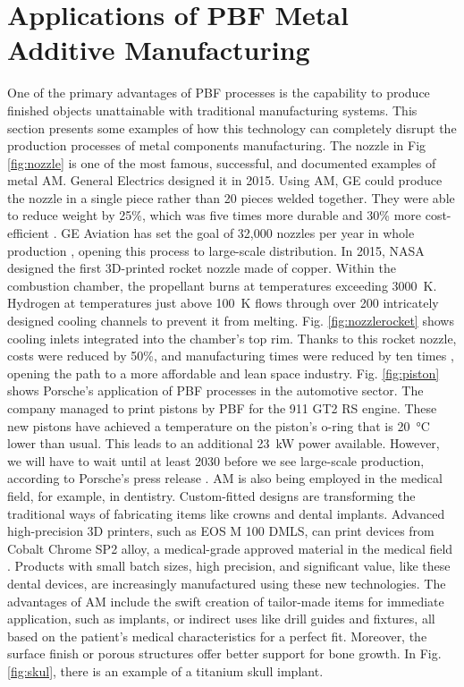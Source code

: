 \section{Applications of PBF Metal Additive Manufacturing}
\label{sec:examplesPBF}
One of the primary advantages of PBF processes is the capability to produce finished objects unattainable with traditional manufacturing systems. This section presents some examples of how this technology can completely disrupt the production processes of metal components manufacturing. The nozzle in Fig \ref{fig:nozzle} is one of the most famous, successful, and documented examples of metal AM. General Electrics designed it in 2015. Using AM, GE could produce the nozzle in a single piece rather than 20 pieces welded together. They were able to reduce weight by 25\%, which was five times more durable and 30\% more cost-efficient \cite{amy_kover_transformation_2018}. GE Aviation has set the goal of 32,000 nozzles per year in whole production \cite{milewski_additive_2017}, opening this process to large-scale distribution. In 2015, NASA designed the first 3D-printed rocket nozzle made of copper. Within the combustion chamber, the propellant burns at temperatures exceeding \SI{3000}{\kelvin}. Hydrogen at temperatures just above \SI{100}{\kelvin} flows through over 200 intricately designed cooling channels to prevent it from melting. Fig. \ref{fig:nozzlerocket} shows cooling inlets integrated into the chamber's top rim. Thanks to this rocket nozzle, costs were reduced by 50\%, and manufacturing times were reduced by ten times \cite{tracy_mcmahan_nasa_2015}, opening the path to a more affordable and lean space industry. Fig. \ref{fig:piston} shows Porsche's application of PBF processes in the automotive sector. The company managed to print pistons by PBF for the 911 GT2 RS engine. These new pistons have achieved a temperature on the piston's o-ring that is \SI{20}{\degreeCelsius} lower than usual. This leads to an additional \SI{23}{\kilo\watt} power available. However, we will have to wait until at least 2030 before we see large-scale production, according to Porsche's press release \cite{roberto_baldwin_porsches_2020}. AM is also being employed in the medical field, for example, in dentistry. Custom-fitted designs are transforming the traditional ways of fabricating items like crowns and dental implants. Advanced high-precision 3D printers, such as EOS M 100 DMLS, can print devices from Cobalt Chrome SP2 alloy, a medical-grade approved material in the medical field \cite{milewski_additive_2017}. Products with small batch sizes, high precision, and significant value, like these dental devices, are increasingly manufactured using these new technologies. The advantages of AM include the swift creation of tailor-made items for immediate application, such as implants, or indirect uses like drill guides and fixtures, all based on the patient's medical characteristics for a perfect fit. Moreover, the surface finish or porous structures offer better support for bone growth. In Fig. \ref{fig:skul}, there is an example of a titanium skull implant.
